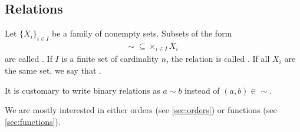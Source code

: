 \subsection{Relations}\label{sec:relations}

\begin{definition}\label{def:relation}
  Let \( \{ X_i \}_{i \in I} \) be a family of nonempty sets.
  Subsets of the form
  \begin{align*}
    \sim\; \subseteq \times_{i \in I} X_i
  \end{align*}
  are called . If \( I \) is a finite set of cardinality \( n \), the relation is called . If all \( X_i \) are the same set, we say that .

  It is customary to write binary relations as \( a \sim b \) instead of \( (a, b) \in \sim \).
\end{definition}

\begin{note}\label{note:main_relation_types}
  We are mostly interested in either orders (see \cref{sec:orders}) or functions (see \cref{sec:functions}).
\end{note}

